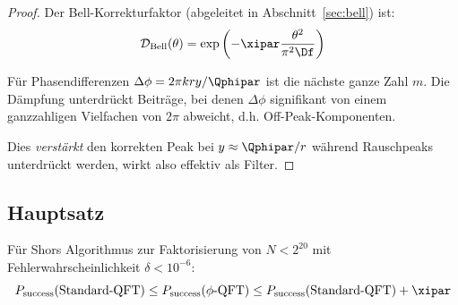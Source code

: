 \begin{proof}
	Der Bell-Korrekturfaktor (abgeleitet in Abschnitt~\ref{sec:bell}) ist:
	\begin{equation}
		\mathcal{D}_{\text{Bell}}(\theta) = \exp\left(-\xipar \frac{\theta^2}{\pi^2 \Df}\right)
	\end{equation}
	
	Für Phasendifferenzen $\Delta\phi = 2\pi kry/\Qphipar$ ist die nächste ganze Zahl $m$. Die Dämpfung unterdrückt Beiträge, bei denen $\Delta\phi$ signifikant von einem ganzzahligen Vielfachen von $2\pi$ abweicht, d.h. Off-Peak-Komponenten.
	
	Dies \emph{verstärkt} den korrekten Peak bei $y \approx \Qphipar/r$ während Rauschpeaks unterdrückt werden, wirkt also effektiv als Filter.
\end{proof}

\subsection{Hauptsatz}

\begin{theorem}
	\label{thm:main}
	Für Shors Algorithmus zur Faktorisierung von $N < 2^{20}$ mit Fehlerwahrscheinlichkeit $\delta < 10^{-6}$:
	\begin{equation}
		P_{\text{success}}(\text{Standard-QFT}) \leq P_{\text{success}}(\text{$\phi$-QFT}) \leq P_{\text{success}}(\text{Standard-QFT}) + \xipar
	\end{equation}
\end{theorem}

